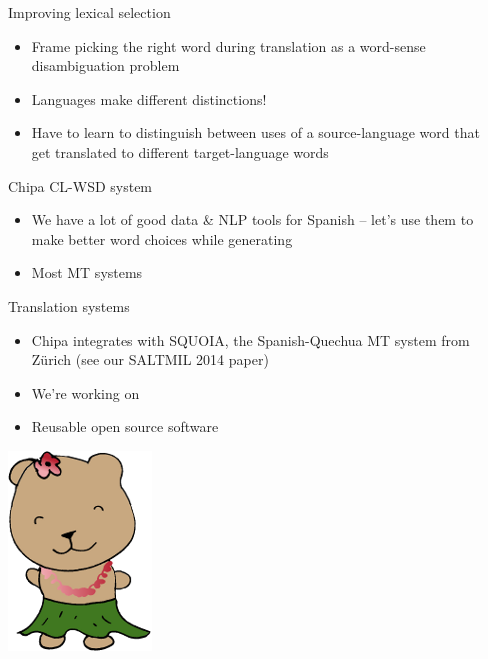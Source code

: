 \documentclass[final]{beamer}
\begin{document}
\begin{frame}{}
\begin{columns}[t]
\begin{column}{.33\linewidth}
  \end{column}


  \begin{column}{.33\linewidth}
  \vfill
  \begin{block}{\large Improving lexical selection}
    \begin{itemize}
    \item Frame picking the right word during translation as a word-sense disambiguation problem
    \item Languages make different distinctions!
    \item Have to learn to distinguish between uses of a source-language word
    that get translated to different target-language words
    \end{itemize}
  \end{block}

  \begin{block}{\large Chipa CL-WSD system}
    \begin{itemize}
    \item We have a lot of good data \& NLP tools for Spanish -- let's use them
    to make better word choices while generating 
    \item Most MT systems 
    \end{itemize}
  \end{block}


  \begin{block}{\large Translation systems}
    \centering
    \begin{itemize}
    \item Chipa integrates with SQUOIA, the Spanish-Quechua MT system from Zürich (see our SALTMIL 2014 paper)
    \item We're working on 
    \item Reusable open source software
    \end{itemize}
  \end{block}
  \hfill
  \includegraphics[width=.20\linewidth]{hltdi-logo-small.png}


  \end{column}

\end{columns}

\end{frame}
\end{document}
